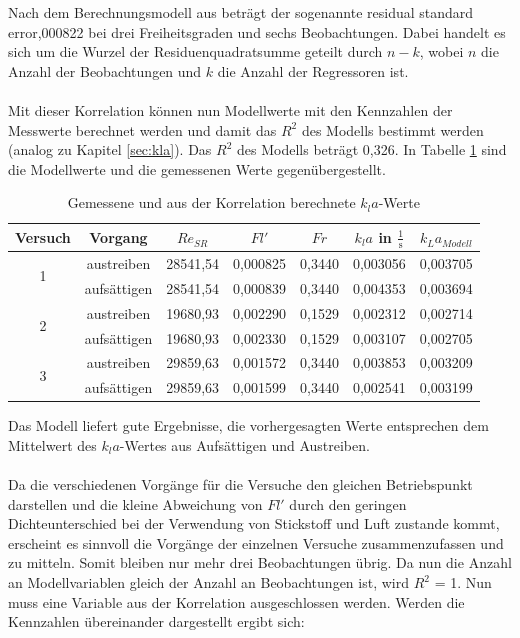 \documentclass[12pt,liststotoc]{report}
\begin{document}
Nach dem Berechnungsmodell aus \cite{wilkinson1973symbolic} beträgt der sogenannte \glqq residual standard error\grqq{},000822 bei drei Freiheitsgraden und sechs Beobachtungen. Dabei handelt es sich um die Wurzel der Residuenquadratsumme geteilt durch $n - k$, wobei $n$ die Anzahl der Beobachtungen und $k$ die Anzahl der Regressoren ist.\\
\\
Mit dieser Korrelation können nun Modellwerte mit den Kennzahlen der Messwerte berechnet werden und damit das $R^2$ des Modells bestimmt werden (analog zu Kapitel \ref{sec:kla}). Das $R^2$ des Modells beträgt 0,326. In Tabelle \ref{tab:korrelation} sind die Modellwerte und die gemessenen Werte gegenübergestellt.

\begin{table}[H]
  \centering
  \caption{Gemessene und aus der Korrelation berechnete $k_la$-Werte}
    \begin{tabular}{ccccccc}
    \toprule
    Versuch & Vorgang & $Re_{SR}$    & $Fl'$    & $Fr$    & $k_la$ in $\frac{1}{\text{s}}$   & $k_La_{Modell}$ \\
    \midrule
    \multirow{2}[0]{*}{1} & austreiben & 28541,54 & 0,000825 & 0,3440 & 0,003056 & 0,003705 \\
          & aufsättigen & 28541,54 & 0,000839 & 0,3440 & 0,004353 & 0,003694 \\
          \midrule
    \multirow{2}[0]{*}{2} & austreiben & 19680,93 & 0,002290 & 0,1529 & 0,002312 & 0,002714 \\
          & aufsättigen & 19680,93 & 0,002330 & 0,1529 & 0,003107 & 0,002705 \\
          \midrule
    \multirow{2}[0]{*}{3} & austreiben & 29859,63 & 0,001572 & 0,3440 & 0,003853 & 0,003209 \\
          & aufsättigen & 29859,63 & 0,001599 & 0,3440 & 0,002541 & 0,003199 \\
          \bottomrule
    \end{tabular}%
  \label{tab:korrelation}%
\end{table}%

Das Modell liefert gute Ergebnisse, die vorhergesagten Werte entsprechen dem Mittelwert des $k_la$-Wertes aus Aufsättigen und Austreiben.\\
\\
Da die verschiedenen Vorgänge für die Versuche den gleichen Betriebspunkt darstellen und die kleine Abweichung von $Fl'$ durch den geringen Dichteunterschied bei der Verwendung von Stickstoff und Luft zustande kommt, erscheint es sinnvoll die Vorgänge der einzelnen Versuche zusammenzufassen und zu mitteln. Somit bleiben nur mehr drei Beobachtungen übrig. Da nun die Anzahl an Modellvariablen gleich der Anzahl an Beobachtungen ist, wird $R^2$ = 1. Nun muss eine Variable aus der Korrelation ausgeschlossen werden. Werden die Kennzahlen übereinander dargestellt ergibt sich:
\end{document}
